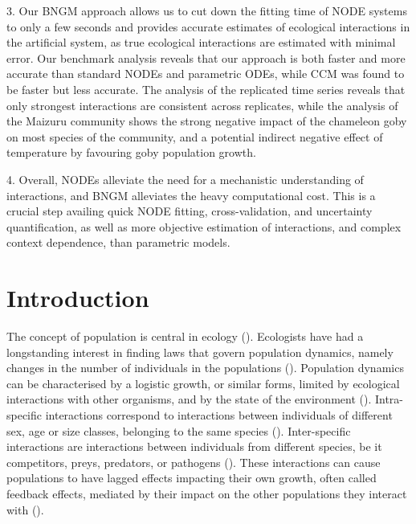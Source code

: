 \documentclass[11pt, oneside]{article}
\begin{document}
3. Our BNGM approach allows us to cut down the fitting time of NODE systems to only a few seconds and provides accurate estimates of ecological interactions in the artificial system, as true ecological interactions are estimated with minimal error.
Our benchmark analysis reveals that our approach is both faster and more accurate than standard NODEs and parametric ODEs, while CCM was found to be faster but less accurate. 
The analysis of the replicated time series reveals that only strongest interactions are consistent across replicates, while the analysis of the Maizuru community shows the strong negative impact of the chameleon goby on most species of the community, and a potential indirect negative effect of temperature by favouring goby population growth.

4. Overall, NODEs alleviate the need for a mechanistic understanding of interactions, and BNGM alleviates the heavy computational cost. 
This is a crucial step availing quick NODE fitting, cross-validation, and uncertainty quantification, as well as more objective estimation of interactions, and complex context dependence, than parametric models. 

\newpage
{}
\setcounter{page}{1}
\linenumbers
{}

\section{Introduction}

The concept of population is central in ecology (\cite{Berryman2002}).
Ecologists have had a longstanding interest in finding laws that govern population dynamics, namely changes in the number of individuals in the populations (\cite{Lawton1999,Turchin1999a}).
Population dynamics can be characterised by a logistic growth, or similar forms, limited by ecological interactions with other organisms, and by the state of the environment (\cite{Turchin2001c,Berryman2003}).
Intra-specific interactions correspond to interactions between individuals of different sex, age or size classes, belonging to the same species (\cite{Turchin2001c}).
Inter-specific interactions are interactions between individuals from different species, be it competitors, preys, predators, or pathogens (\cite{Turchin2001c,Berryman2003}).
These interactions can cause populations to have lagged effects impacting their own growth, often called feedback effects, mediated by their impact on the other populations they interact with (\cite{Berryman1997}).
\end{document}
